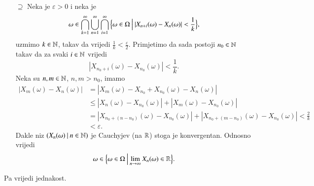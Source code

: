 \begin{nap}
\begin{enumerate}
        \item[$\supseteq$]
        Neka je $\varepsilon > 0$ i neka je
        \begin{equation*}
            \omega \in \bigcap\limits_{k = 1}^{\infty} \bigcup\limits_{n = 1}^{\infty} \bigcap\limits_{i = 1}^{\infty} \Big\{ {\omega \in \Omega} \: \Big| \: {|X_{n + i} (\omega) - X_n (\omega)| < \frac{1}{k}} \Big\},
        \end{equation*}
        uzmimo $k \in \mathbb{N}$, takav da vrijedi $ \frac{1}{k} < \frac{\varepsilon}{2}$.
        Primjetimo da sada postoji $n_0 \in \mathbb{N}$ takav da za svaki $i \in \mathbb{N}$ vrijedi
        \begin{equation*}
            |X_{n_0 + i} (\omega) - X_{n_0} (\omega) | < \frac{1}{k}.
        \end{equation*}
        Neka su $n, m \in \mathbb{N}$, $n, m > n_0$, imamo
        \begin{equation*}
            \begin{aligned}
                |X_m (\omega) - X_n (\omega) | &= |X_m (\omega) - X_{n_0} + X_{n_0} (\omega) - X_n (\omega) |\\
                &\leq | X_{n} (\omega) - X_{n_0} (\omega) | + | X_m (\omega) - X_{n_0} (\omega) |\\
                &= | X_{n_0 + (n - n_0) } (\omega) - X_{n_0} (\omega) | + | X_{n_0 + ( m - n_0 ) } (\omega) - X_{n_0} (\omega) | < \frac{2}{k}\\
                &< \varepsilon.
            \end{aligned}
        \end{equation*}
        Dakle niz $({X_n (\omega)} \: | \: {n \in \mathbb{N}})$ je Cauchyjev (na $\mathbb{R}$) stoga je konvergentan.
        Odnosno vrijedi
        \begin{equation*}
            \omega \in \Big\{ {\omega \in \Omega} \: \Big| \: {\lim\limits_{n \to \infty} X_n (\omega) \in \mathbb{R}} \Big\}.
        \end{equation*}
    \end{enumerate}
    Pa vrijedi jednakost.
\end{nap}

